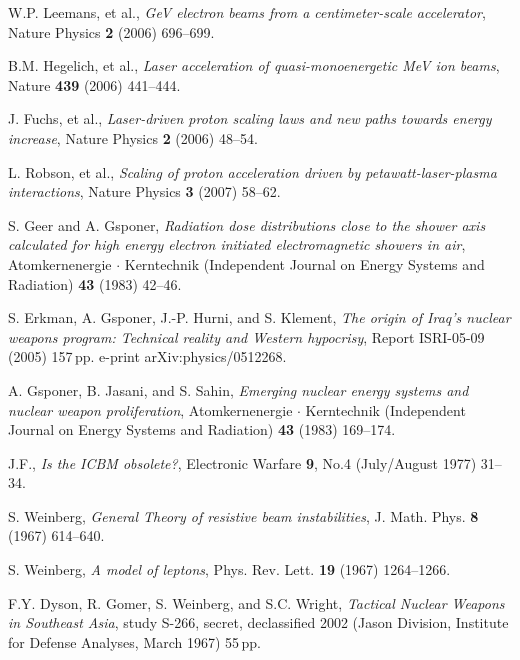 \documentclass [12pt,a4paper,     ]{report} %
\begin{document}
\begin{enumerate}
 W.P. Leemans, et al., \emph{GeV electron beams from a centimeter-scale accelerator}, Nature Physics {\bf 2} (2006) 696--699.

  B.M. Hegelich, et al., \emph{Laser acceleration of quasi-monoenergetic MeV ion beams}, Nature {\bf 439} (2006) 441--444.

  J. Fuchs, et al., \emph{Laser-driven proton scaling laws and new paths towards energy increase}, Nature Physics {\bf 2} (2006) 48--54.

  L. Robson, et al., \emph{Scaling of proton acceleration driven by petawatt-laser-plasma interactions}, Nature Physics {\bf 3} (2007) 58--62.


 S. Geer and A. Gsponer, \emph{Radiation dose distributions close to the shower axis calculated for high energy electron initiated electromagnetic showers in air}, Atomkernenergie $\cdot$ Kerntechnik  (Independent Journal on Energy Systems and Radiation) {\bf 43} (1983) 42--46.




 S. Erkman, A. Gsponer, J.-P. Hurni, and S. Klement, \emph{The origin of Iraq's nuclear weapons program: Technical reality and Western hypocrisy}, Report ISRI-05-09 (2005) 157\,pp. e-print arXiv:physics/0512268.

 A. Gsponer, B. Jasani, and S. Sahin, \emph{Emerging nuclear energy systems and nuclear weapon proliferation}, Atomkernenergie $\cdot$ Kerntechnik  (Independent Journal on Energy Systems and Radiation) {\bf 43} (1983) 169--174.

 J.F., \emph{Is the ICBM obsolete?}, Electronic Warfare {\bf 9}, No.4 (July/August 1977) 31--34.

 S. Weinberg, \emph{General Theory of resistive beam instabilities}, J. Math. Phys. {\bf 8} (1967) 614--640.

 S. Weinberg, \emph{A model of leptons}, Phys. Rev. Lett. {\bf 19} (1967) 1264--1266.

 F.Y. Dyson, R. Gomer, S. Weinberg, and S.C. Wright, \emph{Tactical Nuclear Weapons in Southeast Asia}, study S-266, secret, declassified 2002 (Jason Division, Institute for Defense Analyses, March 1967) 55\,pp.



\end{enumerate}
\end{document}
